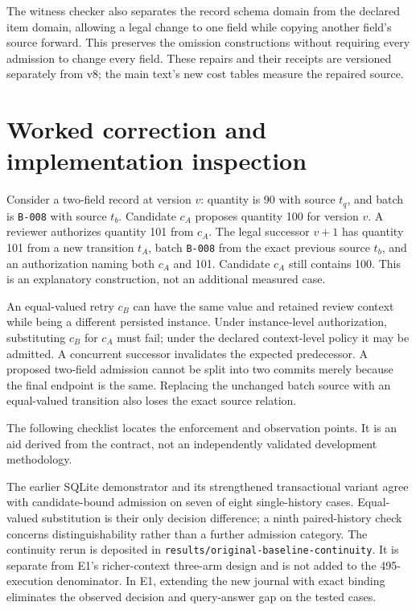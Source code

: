 \documentclass[11pt,a4paper]{article}
\newcommand{\code}[1]{\nolinkurl{#1}}
\begin{document}
The witness checker also separates the record schema domain from the declared item domain, allowing a legal change to one field while copying another field's source forward. This preserves the omission constructions without requiring every admission to change every field. These repairs and their receipts are versioned separately from v8; the main text's new cost tables measure the repaired source.

\section{Worked correction and implementation inspection}
\label{app:worked-example}

Consider a two-field record at version $v$: quantity is 90 with source $t_q$, and batch is \code{B-008} with source $t_b$. Candidate $c_A$ proposes quantity 100 for version $v$. A reviewer authorizes quantity 101 from $c_A$. The legal successor $v+1$ has quantity 101 from a new transition $t_A$, batch \code{B-008} from the exact previous source $t_b$, and an authorization naming both $c_A$ and 101. Candidate $c_A$ still contains 100. This is an explanatory construction, not an additional measured case.

An equal-valued retry $c_B$ can have the same value and retained review context while being a different persisted instance. Under instance-level authorization, substituting $c_B$ for $c_A$ must fail; under the declared context-level policy it may be admitted. A concurrent successor invalidates the expected predecessor. A proposed two-field admission cannot be split into two commits merely because the final endpoint is the same. Replacing the unchanged batch source with an equal-valued transition also loses the exact source relation.

The following checklist locates the enforcement and observation points. It is an aid derived from the contract, not an independently validated development methodology.


The earlier SQLite demonstrator and its strengthened transactional variant agree with candidate-bound admission on seven of eight single-history cases. Equal-valued substitution is their only decision difference; a ninth paired-history check concerns distinguishability rather than a further admission category. The continuity rerun is deposited in \code{results/original-baseline-continuity}. It is separate from E1's richer-context three-arm design and is not added to the 495-execution denominator. In E1, extending the new journal with exact binding eliminates the observed decision and query-answer gap on the tested cases.
\end{document}
